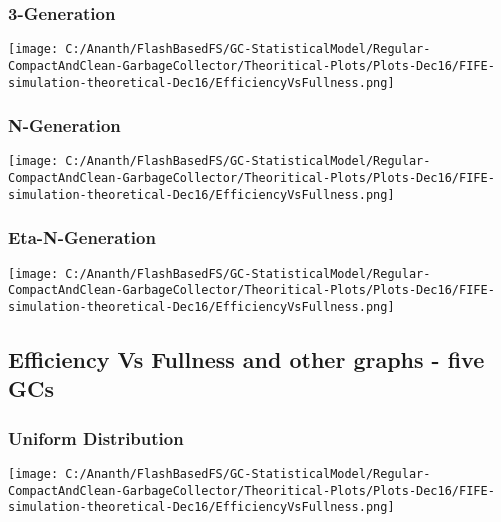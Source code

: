 \subsubsection{3-Generation}
\begin{SCfigure}
	\centering
	\texttt{[image: C:/Ananth/FlashBasedFS/GC-StatisticalModel/Regular-CompactAndClean-GarbageCollector/Theoritical-Plots/Plots-Dec16/FIFE-simulation-theoretical-Dec16/EfficiencyVsFullness.png]}
\end{SCfigure}

\subsubsection{N-Generation}
\begin{SCfigure}
	\centering
	\texttt{[image: C:/Ananth/FlashBasedFS/GC-StatisticalModel/Regular-CompactAndClean-GarbageCollector/Theoritical-Plots/Plots-Dec16/FIFE-simulation-theoretical-Dec16/EfficiencyVsFullness.png]}
\end{SCfigure}

\subsubsection{Eta-N-Generation}
\begin{SCfigure}
	\centering
	\texttt{[image: C:/Ananth/FlashBasedFS/GC-StatisticalModel/Regular-CompactAndClean-GarbageCollector/Theoritical-Plots/Plots-Dec16/FIFE-simulation-theoretical-Dec16/EfficiencyVsFullness.png]}
\end{SCfigure}


\subsection{Efficiency Vs Fullness and other graphs - five GCs}

\subsubsection{Uniform Distribution}
\begin{SCfigure}
	\centering
	\texttt{[image: C:/Ananth/FlashBasedFS/GC-StatisticalModel/Regular-CompactAndClean-GarbageCollector/Theoritical-Plots/Plots-Dec16/FIFE-simulation-theoretical-Dec16/EfficiencyVsFullness.png]}
\end{SCfigure}

